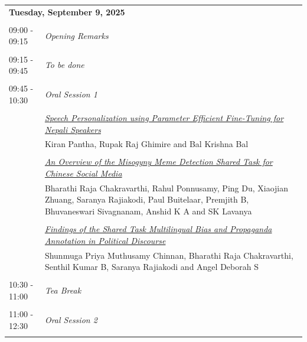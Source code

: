 \documentclass[11pt,oneside]{book}
\begin{document}
        \begin{tabular}{p{24mm}p{124mm}}
    \multicolumn{2}{l}{\bf Tuesday, September 9, 2025 } \\\\
                09:00 - 09:15 & \emph{Opening Remarks}\\\\
      
                      09:15 - 09:45 & \emph{To be done}\\\\
      
                      09:45 - 10:30 & \emph{Oral Session 1}\\\\
      
                
                      & \hyperlink{page.189}{\emph{Speech Personalization using Parameter Efficient Fine-Tuning for Nepali Speakers}}\\
        & Kiran Pantha\index{Pantha}, Rupak Raj Ghimire\index{Ghimire} and Bal Krishna Bal\index{Bal}\\\\
                
                      & \hyperlink{page.199}{\emph{An Overview of the Misogyny Meme Detection Shared Task for Chinese Social Media}}\\
        & Bharathi Raja Chakravarthi\index{Chakravarthi}, Rahul Ponnusamy\index{Ponnusamy}, Ping Du\index{Du}, Xiaojian Zhuang\index{Zhuang}, Saranya Rajiakodi\index{Rajiakodi}, Paul Buitelaar\index{Buitelaar}, Premjith B\index{B}, Bhuvaneswari Sivagnanam\index{Sivagnanam}, Anshid K A\index{A} and SK Lavanya\index{Lavanya}\\\\
                
                      & \hyperlink{page.208}{\emph{Findings of the Shared Task Multilingual Bias and Propaganda Annotation in Political Discourse}}\\
        & Shunmuga Priya Muthusamy Chinnan\index{Chinnan}, Bharathi Raja Chakravarthi\index{Chakravarthi}, Senthil Kumar B\index{B}, Saranya Rajiakodi\index{Rajiakodi} and Angel Deborah S\index{S}\\\\
                      10:30 - 11:00 & \emph{Tea Break}\\\\
      
                      11:00 - 12:30 & \emph{Oral Session 2}\\\\
      

\end{tabular}
\end{document}
